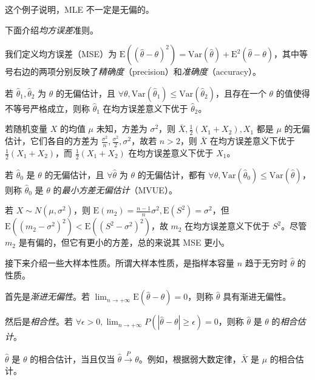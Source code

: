 \documentclass[../main.tex]{subfiles}
\begin{document}
这个例子说明，MLE 不一定是无偏的。

下面介绍\emph{均方误差}准则。

我们定义均方误差（MSE）为 $\mathrm E((\hat\theta-\theta)^2)=\mathrm{Var}(\hat\theta)+\mathrm E^2(\hat\theta-\theta)$，其中等号右边的两项分别反映了\emph{精确度}（precision）和\emph{准确度}（accuracy）。

\begin{definition}\label{def:6.3.2}
    若 $\hat\theta_1,\hat\theta_2$ 为 $\theta$ 的无偏估计，且 $\forall\theta,\mathrm{Var}(\hat\theta_1)\leq\mathrm{Var}(\hat\theta_2)$，且存在一个 $\theta$ 的值使得不等号严格成立，则称 $\hat\theta_1$ 在均方误差意义下优于 $\hat\theta_2$。
\end{definition}

\begin{example}
    若随机变量 $X$ 的均值 $\mu$ 未知，方差为 $\sigma^2$，则 $\bar X,\frac12(X_1+X_2),X_1$ 都是 $\mu$ 的无偏估计，它们各自的方差为 $\frac{\sigma^2}n,\frac{\sigma^2}2,\sigma^2$，故若 $n>2$，则 $\bar X$ 在均方误差意义下优于 $\frac12(X_1+X_2)$，而 $\frac12(X_1+X_2)$ 在均方误差意义下优于 $X_1$。
\end{example}

\begin{definition}\label{def:6.3.3}
    若 $\hat\theta_0$ 是 $\theta$ 的无偏估计，且 $\forall\hat\theta$ 为 $\theta$ 的无偏估计，都有 $\forall\theta,\mathrm{Var}(\hat\theta_0)\leq\mathrm{Var}(\hat\theta)$，则称 $\hat\theta_0$ 是 $\theta$ 的\emph{最小方差无偏估计}（MVUE）。
\end{definition}

\begin{example}
    若 $X\sim N(\mu,\sigma^2)$，则 $\mathrm E(m_2)=\frac{n-1}n\sigma^2,\mathrm E(S^2)=\sigma^2$，但 $\mathrm E((m_2-\sigma^2)^2)<\mathrm E((S^2-\sigma^2)^2)$，故 $m_2$ 在均方误差意义下优于 $S^2$。尽管 $m_2$ 是有偏的，但它有更小的方差，总的来说其 MSE 更小。
\end{example}

接下来介绍一些大样本性质。所谓大样本性质，是指样本容量 $n$ 趋于无穷时 $\hat\theta$ 的性质。

首先是\emph{渐进无偏性}。若 $\lim_{n\rightarrow+\infty}\mathrm E(\hat\theta-\theta)=0$，则称 $\hat\theta$ 具有渐进无偏性。

然后是\emph{相合性}。若 $\forall\epsilon>0,\lim_{n\rightarrow+\infty}P(|\hat\theta-\theta|\geq\epsilon)=0$，则称 $\hat\theta$ 是 $\theta$ 的\emph{相合估计}。

$\hat\theta$ 是 $\theta$ 的相合估计，当且仅当 $\hat\theta\overset{P}\rightarrow\theta$。例如，根据弱大数定律，$\bar X$ 是 $\mu$ 的相合估计。
\end{document}
